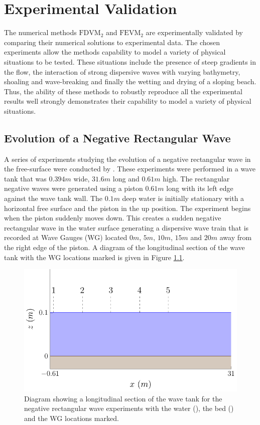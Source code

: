 
\chapter{Experimental Validation}
\label{chp:ExpMethodComp}

The numerical methods $\text{FDVM}_2$ and $\text{FEVM}_2$ are experimentally validated by comparing their numerical solutions to experimental data. The chosen experiments allow the methods capability to model a variety of physical situations to be tested. These situations include the presence of steep gradients in the flow, the interaction of strong dispersive waves with varying bathymetry, shoaling and wave-breaking and finally the wetting and drying of a sloping beach. Thus, the ability of these methods to robustly reproduce all the experimental results well strongly demonstrates their capability to model a variety of physical situations. 

\section{Evolution of a Negative Rectangular Wave}
A series of experiments studying the evolution of a negative rectangular wave in the free-surface were conducted by \citet{Hammack-Segur-1978-337}. These experiments were performed in a wave tank that was $0.394m$ wide, $31.6m$ long and $0.61m$ high. The rectangular negative waves were generated using a piston $0.61m$ long with its left edge against the wave tank wall. The $0.1m$ deep water is initially stationary with a horizontal free surface and the piston in the up position. The experiment begins when the piston suddenly moves down. This creates a sudden negative rectangular wave in the water surface generating a dispersive wave train that is recorded at Wave Gauges (WG) located $0m$, $5m$, $10m$, $15m$ and $20m$ away from the right edge of the piston. A diagram of the longitudinal section of the wave tank with the WG locations marked is given in Figure \ref{fig:SegurWT}.

\begin{figure}
	\centering
	\includegraphics[width=\textwidth]{./chp6/figures/Experiment/Segur/WaveTank.pdf}
	\caption{Diagram showing a longitudinal section of the wave tank for the negative rectangular wave experiments with the water (), the bed () and the WG locations marked.}
	\label{fig:SegurWT}
\end{figure} 

